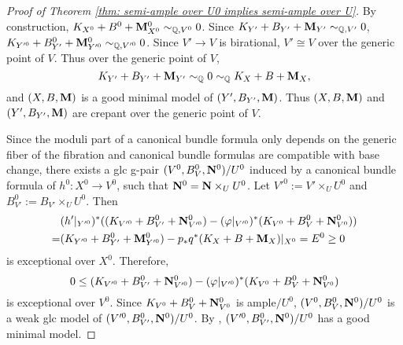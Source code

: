 \documentclass[11pt]{amsart}
\numberwithin{equation}{section}
\newcommand{\Mm}{{\bf{M}}}
\newcommand{\NN}{{\bf{N}}}
\theoremstyle{definition}
\theoremstyle{definition}
\theoremstyle{definition}
\begin{document}
\begin{proof}[Proof of Theorem \ref{thm: semi-ample over U0 implies semi-ample over U}]
By construction, $K_{X^0}+B^0+\Mm^0_{X^0}\sim_{\mathbb Q,V^0}0$. Since $K_{Y'}+B_{Y'}+\Mm_{Y'}\sim_{\mathbb Q,V'}0$, $K_{Y'^0}+B^0_{Y'}+\Mm^0_{Y'^0}\sim_{\mathbb Q,V'^0}0$. Since $V'\rightarrow V$ is birational, $V'\cong V$ over the generic point of $V$. Thus over the generic point of $V$,
$$K_{Y'}+B_{Y'}+\Mm_{Y'}\sim_{\mathbb Q}0\sim_{\mathbb Q}K_{X}+B+\Mm_{X},$$
and $(X,B,\Mm)$ is a good minimal model of $(Y',B_{Y'},\Mm)$. Thus $(X,B,\Mm)$ and $(Y',B_{Y'},\Mm)$ are crepant over the generic point of $V$. 

Since the moduli part of a canonical bundle formula only depends on the generic fiber of the fibration and canonical bundle formulas are compatible with base change, there exists a glc g-pair $(V^0,B^0_{V},\NN^0)/U^0$ induced by a canonical bundle formula of $h^0: X^0\rightarrow V^0$, such that $\NN^0=\NN\times_UU^0$. Let $V'^0:=V'\times_UU^0$ and $B^0_{V'}:=B_{V'}\times_UU^0$. Then
\begin{align*}
   &(h'|_{Y'^0})^*((K_{V'^0}+B^0_{V'}+\NN^0_{V'^0})-(\varphi|_{V'^0})^*(K_{V^0}+B^0_{V}+\NN^0_{V^0}))\\
    =&(K_{Y'^0}+B^0_{Y'}+\Mm^0_{Y'^0})-p_*q^*(K_X+B+\Mm_X)|_{X^0}=E^0\geq 0
\end{align*}
is exceptional over $X^0$. Therefore, $$0\leq (K_{V'^0}+B^0_{V'}+\NN^0_{V'^0})-(\varphi|_{V'^0})^*(K_{V^0}+B^0_{V}+\NN^0_{V^0})$$
is exceptional over $V^0$. Since $K_{V^0}+B^0_{V}+\NN^0_{V^0}$ is ample$/U^0$, $(V^0,B^0_{V},\NN^0)/U^0$ is a weak glc model of $(V'^0,B^0_{V'},\NN^0)/U^0$. By \cite[Lemmas 3.9, 3.15]{HL21a}, $(V'^0,B^0_{V'},\NN^0)/U^0$ has a good minimal model.



\end{proof}
\end{document}
